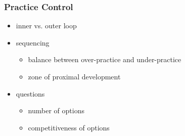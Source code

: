 \documentclass[xcolor=svgnames]{beamer}
\begin{document}
\begin{frame}
	\frametitle{Practice Control}
	\begin{itemize}
		\item inner vs. outer loop
		\item sequencing
			\begin{itemize}
				\item balance between over-practice and under-practice
				\item zone of proximal development
			\end{itemize}
		\item questions
			\begin{itemize}
				\item number of options
				\item competitiveness of options
			\end{itemize}
	\end{itemize}
\end{frame}
\end{document}
